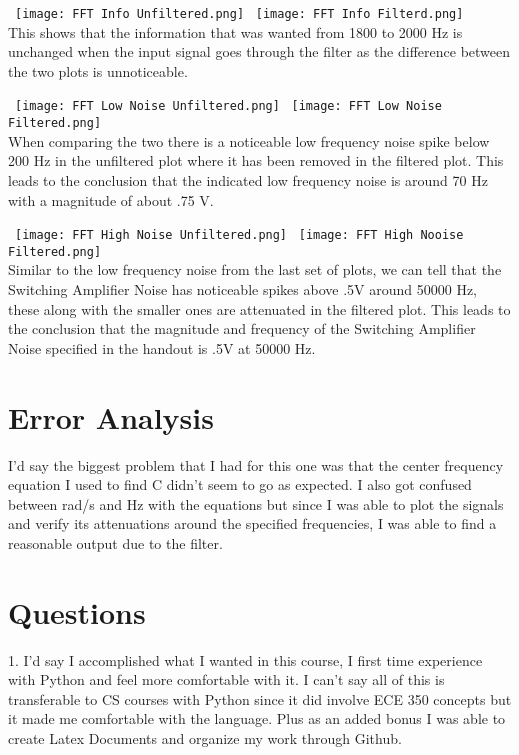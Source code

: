 \documentclass[12pt]{report}
\begin{document}
\ \texttt{[image: FFT Info Unfiltered.png]}
\ \texttt{[image: FFT Info Filterd.png]}
\\ This shows that the information that was wanted from 1800 to 2000 Hz is unchanged when the input signal goes through the filter as the difference between the two plots is unnoticeable.

\ \texttt{[image: FFT Low Noise Unfiltered.png]}
\ \texttt{[image: FFT Low Noise Filtered.png]}
\\ When comparing the two there is a noticeable low frequency noise spike below 200 Hz in the unfiltered plot where it has been removed in the filtered plot. This leads to the conclusion that the indicated low frequency noise is around 70 Hz with a magnitude of about .75 V.

\ \texttt{[image: FFT High Noise Unfiltered.png]}
\ \texttt{[image: FFT High Nooise Filtered.png]}
\\ Similar to the low frequency noise from the last set of plots, we can tell that the Switching Amplifier Noise has noticeable spikes above .5V around 50000 Hz, these along with the smaller ones are attenuated in the filtered plot. This leads to the conclusion that the magnitude and frequency of the Switching Amplifier Noise specified in the handout is .5V at 50000 Hz. 


\section{Error Analysis}

I'd say the biggest problem that I had for this one was that the center frequency equation I used to find C didn't seem to go as expected. I also got confused between rad/s and Hz with the equations but since I was able to plot the signals and verify its attenuations around the specified frequencies, I was able to find a reasonable output due to the filter.  

\section{Questions}
1. I'd say I accomplished what I wanted in this course, I first time experience with Python and feel more comfortable with it. I can't say all of this is transferable to CS courses with Python since it did involve ECE 350 concepts but it made me comfortable with the language. Plus as an added bonus I was able to create Latex Documents and organize my work through Github. 
\newpage
\end{document}
